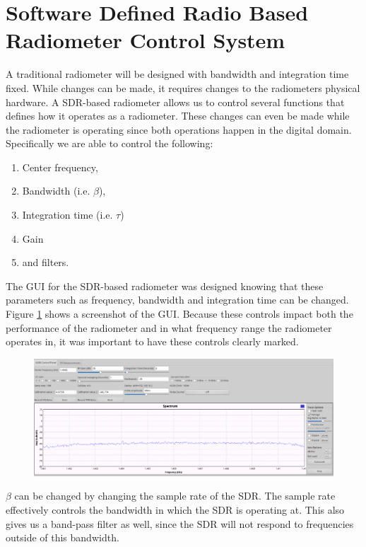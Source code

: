 \section{Software Defined Radio Based Radiometer Control System}

A traditional radiometer will be designed with bandwidth and integration time fixed.  While changes can be made, it requires changes to the radiometers physical hardware.  A SDR-based radiometer allows us to control several functions that defines how it operates as a radiometer.  These changes can even be made while the radiometer is operating since both operations happen in the digital domain. Specifically we are able to control the following: 

\begin{enumerate}
\item Center frequency,
\item Bandwidth (i.e. $\beta$),
\item Integration time (i.e. $\tau$)
\item Gain
\item and filters.
\end{enumerate}

The GUI for the SDR-based radiometer was designed knowing that these parameters such as frequency, bandwidth and integration time can be changed.  Figure \ref{radiometer_gui} shows a screenshot of the GUI.  Because these controls impact both the performance of the radiometer and in what frequency range the radiometer operates in, it was important to have these controls clearly marked.

{\begin{figure}[h!tb] 
\centering
\includegraphics[width=17cm]{Images/radiometer_gui.png}
\label{radiometer_gui}
\end{figure}
}

$\beta$ can be changed by changing the sample rate of the SDR.  The sample rate effectively controls the bandwidth in which the SDR is operating at.  This also gives us a band-pass filter as well, since the SDR will not respond to frequencies outside of this bandwidth.  


